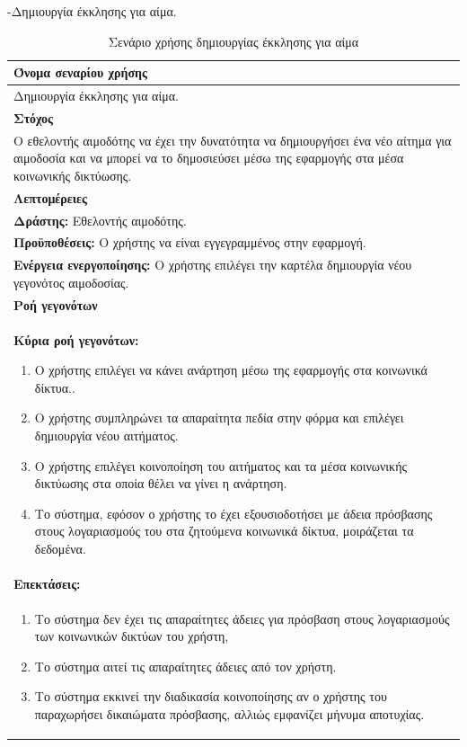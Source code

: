 \newpage
-Δημιουργία έκκλησης για αίμα.
\begin{table}[H]
	\begin{center}
	    \begin{tabular}{|p{\dimexpr \linewidth-2\tabcolsep}|}
	    \hline
	    \rowcolor{grayy}
	    \textbf{Όνομα σεναρίου χρήσης}
	    \\ \hline    
	    Δημιουργία έκκλησης για αίμα.
	     \\ \hline
	    \rowcolor{grayy}
	    \textbf{\textbf{Στόχος}}
	    \\ \hline
	 	 Ο εθελοντής αιμοδότης να έχει την δυνατότητα να δημιουργήσει ένα νέο αίτημα για αιμοδοσία και να μπορεί να το δημοσιεύσει μέσω της εφαρμογής στα μέσα κοινωνικής δικτύωσης.
	    \\ \hline
	    \rowcolor{grayy}
	    \textbf{Λεπτομέρειες}
	    \\ \hline
		\textbf{Δράστης:} Εθελοντής αιμοδότης.
		\\*
		\textbf{Προϋποθέσεις:} Ο χρήστης να είναι εγγεγραμμένος στην εφαρμογή.
		\\*
		\textbf{Ενέργεια ενεργοποίησης:} Ο χρήστης επιλέγει την καρτέλα δημιουργία νέου γεγονότος αιμοδοσίας.
		\\ \hline
		\rowcolor{grayy}    
	    \textbf{Ροή γεγονότων}
	    \\ \hline
		\textbf{Κύρια ροή γεγονότων:}
		\begin{enumerate}
		\item	 Ο χρήστης επιλέγει να κάνει ανάρτηση μέσω της εφαρμογής  στα κοινωνικά δίκτυα..
		\item Ο χρήστης συμπληρώνει τα απαραίτητα πεδία στην φόρμα και επιλέγει δημιουργία νέου αιτήματος.
		\item Ο χρήστης επιλέγει κοινοποίηση του αιτήματος και τα μέσα κοινωνικής δικτύωσης στα οποία θέλει να γίνει η ανάρτηση.
	   \item Το σύστημα, εφόσον ο χρήστης το έχει εξουσιοδοτήσει με άδεια πρόσβασης στους λογαριασμούς του στα ζητούμενα κοινωνικά δίκτυα, μοιράζεται τα δεδομένα.
		\end{enumerate}
		\\ \hline
		\rowcolor{grayy}
		\textbf{Επεκτάσεις:}
		   \\ \hline
		\begin{enumerate}
			\item Το σύστημα δεν έχει τις απαραίτητες άδειες για πρόσβαση στους λογαριασμούς των κοινωνικών δικτύων του χρήστη,
			\item Το σύστημα αιτεί τις απαραίτητες άδειες από τον χρήστη.
			\item Το σύστημα εκκινεί την διαδικασία κοινοποίησης αν ο χρήστης του παραχωρήσει δικαιώματα πρόσβασης, αλλιώς εμφανίζει μήνυμα αποτυχίας.
		\end{enumerate}
		\\ \hline
	    \end{tabular}
	    \caption{Σενάριο χρήσης δημιουργίας έκκλησης για αίμα}
	    \label{tab:create_blood_donor_request} 
	\end{center}
\end{table}

